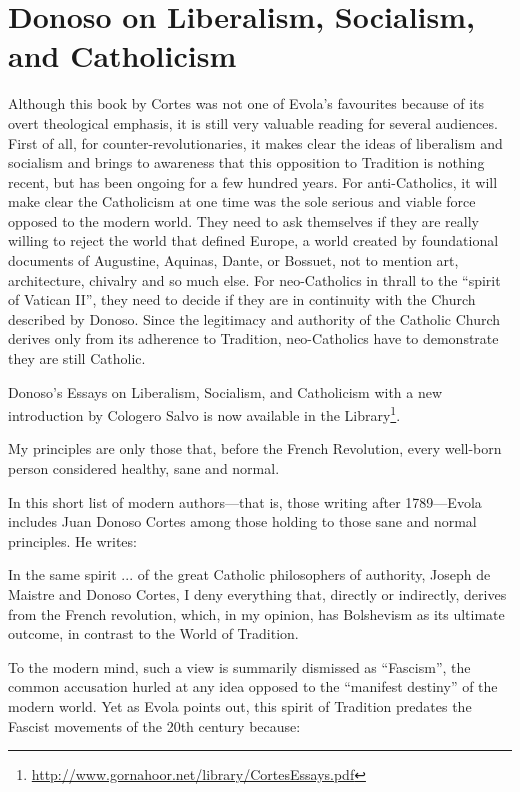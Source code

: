 \section{Donoso on Liberalism, Socialism, and Catholicism}

Although this book by Cortes was not one of Evola's favourites because of its overt theological emphasis, it is still very valuable reading for several audiences. First of all, for counter-revolutionaries, it makes clear the ideas of liberalism and socialism and brings to awareness that this opposition to Tradition is nothing recent, but has been ongoing for a few hundred years. For anti-Catholics, it will make clear the Catholicism at one time was the sole serious and viable force opposed to the modern world. They need to ask themselves if they are really willing to reject the world that defined Europe, a world created by foundational documents of Augustine, Aquinas, Dante, or Bossuet, not to mention art, architecture, chivalry and so much else. For neo-Catholics in thrall to the ``spirit of Vatican II'', they need to decide if they are in continuity with the Church described by Donoso. Since the legitimacy and authority of the Catholic Church derives only from its adherence to Tradition, neo-Catholics have to demonstrate they are still Catholic.

Donoso's Essays on Liberalism, Socialism, and Catholicism with a new introduction by Cologero Salvo is now available in the Library\footnote{\url{http://www.gornahoor.net/library/CortesEssays.pdf}}.

\begin{quotex}
My principles are only those that, before the French Revolution, every well-born person considered healthy, sane and normal.
\end{quotex}


In this short list of modern authors---that is, those writing after 1789---Evola includes Juan Donoso Cortes among those holding to those sane and normal principles. He writes:

\begin{quotex}
In the same spirit ... of the great Catholic philosophers of authority, Joseph de Maistre and Donoso Cortes, I deny everything that, directly or indirectly, derives from the French revolution, which, in my opinion, has Bolshevism as its ultimate outcome, in contrast to the World of Tradition.
\end{quotex}


To the modern mind, such a view is summarily dismissed as ``Fascism'', the common accusation hurled at any idea opposed to the ``manifest destiny'' of the modern world. Yet as Evola points out, this spirit of Tradition predates the Fascist movements of the 20th century because:


